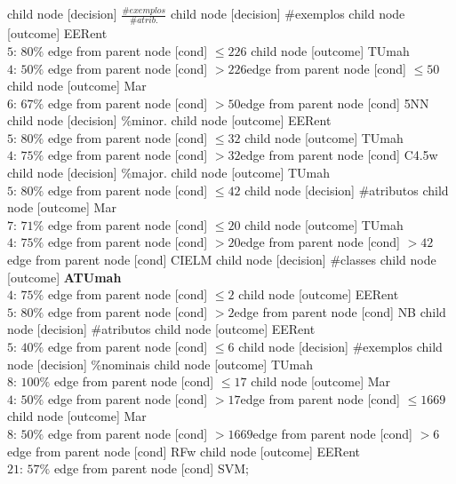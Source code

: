 child {node [decision] {$\frac{\#exemplos}{\#atrib.}$}
child {node [decision] {\#exemplos}
child {node [outcome] {EERent \\$5$: $80\%$} edge from parent node [cond] {$\leq226$}}
child {node [outcome] {TUmah \\$4$: $50\%$} edge from parent node [cond] {$>226$}}edge from parent node [cond] {$\leq50$}}
child {node [outcome] {Mar \\$6$: $67\%$} edge from parent node [cond] {$>50$}}edge from parent node [cond] {5NN}}
child {node [decision] {\%minor.}
child {node [outcome] {EERent \\$5$: $80\%$} edge from parent node [cond] {$\leq32$}}
child {node [outcome] {TUmah \\$4$: $75\%$} edge from parent node [cond] {$>32$}}edge from parent node [cond] {C4.5w}}
child {node [decision] {\%major.}
child {node [outcome] {TUmah \\$5$: $80\%$} edge from parent node [cond] {$\leq42$}}
child {node [decision] {\#atributos}
child {node [outcome] {Mar \\$7$: $71\%$} edge from parent node [cond] {$\leq20$}}
child {node [outcome] {TUmah \\$4$: $75\%$} edge from parent node [cond] {$>20$}}edge from parent node [cond] {$>42$}}edge from parent node [cond] {CIELM}}
child {node [decision] {\#classes}
child {node [outcome] {\textbf{ATUmah} \\$4$: $75\%$} edge from parent node [cond] {$\leq2$}}
child {node [outcome] {EERent \\$5$: $80\%$} edge from parent node [cond] {$>2$}}edge from parent node [cond] {NB}}
child {node [decision] {\#atributos}
child {node [outcome] {EERent \\$5$: $40\%$} edge from parent node [cond] {$\leq6$}}
child {node [decision] {\#exemplos}
child {node [decision] {\%nominais}
child {node [outcome] {TUmah \\$8$: $100\%$} edge from parent node [cond] {$\leq17$}}
child {node [outcome] {Mar \\$4$: $50\%$} edge from parent node [cond] {$>17$}}edge from parent node [cond] {$\leq1669$}}
child {node [outcome] {Mar \\$8$: $50\%$} edge from parent node [cond] {$>1669$}}edge from parent node [cond] {$>6$}}edge from parent node [cond] {RFw}}
child {node [outcome] {EERent \\$21$: $57\%$} edge from parent node [cond] {SVM}};